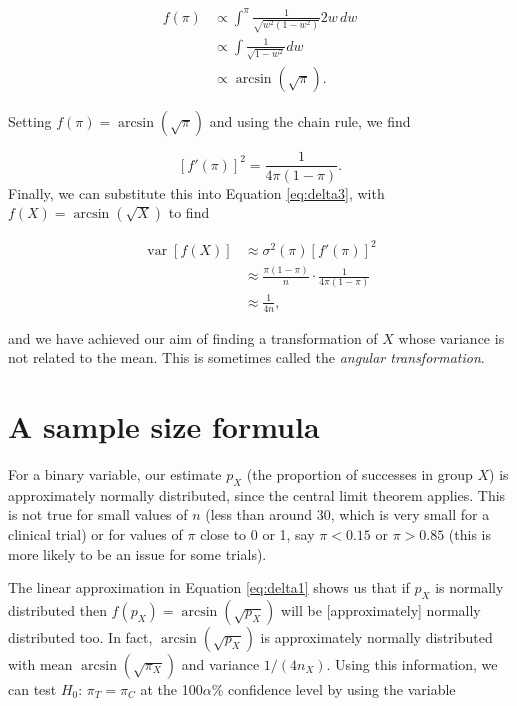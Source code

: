 \documentclass[
  openany]{book}
\theoremstyle{definition}
\theoremstyle{definition}
\theoremstyle{definition}
\theoremstyle{definition}
\theoremstyle{remark}
\begin{document}
\begin{align*}
f\left(\pi\right) & \propto \int^\pi{\frac{1}{\sqrt{w^2\left(1-w^2\right)}}2w\,dw}\\
&\propto \int{\frac{1}{\sqrt{1 - w^2}}}dw\\
& \propto \arcsin{\left(\sqrt{\pi}\right)}.
\end{align*}

Setting \(f\left(\pi\right) = \arcsin\left(\sqrt{\pi}\right)\) and using the chain rule, we find

\[\left[f'\left(\pi\right)\right]^2 = \frac{1}{4\pi\left(1-\pi\right)} .\]
Finally, we can substitute this into Equation \eqref{eq:delta3}, with \(f\left(X\right) = \arcsin\left(\sqrt{X}\right)\) to find

\begin{align*}
  \operatorname{var}\left[f\left(X\right)\right] & \approx \sigma^2\left(\pi\right)\left[f'\left(\pi\right)\right]^2  \\
& \approx{\frac{\pi\left(1-\pi\right)}{n}\cdot\frac{1}{4\pi\left(1-\pi\right)}}\\
& \approx{\frac{1}{4n}},
\end{align*}

and we have achieved our aim of finding a transformation of \(X\) whose variance is not related to the mean. This is sometimes called the \emph{angular transformation}.

\hypertarget{a-sample-size-formula}{%
\section{A sample size formula}\label{a-sample-size-formula}}

For a binary variable, our estimate \(p_X\) (the proportion of successes in group \(X\)) is approximately normally distributed, since the central limit theorem applies. This is not true for small values of \(n\) (less than around 30, which is very small for a clinical trial) or for values of \(\pi\) close to 0 or 1, say \(\pi<0.15\) or \(\pi>0.85\) (this is more likely to be an issue for some trials).

The linear approximation in Equation \eqref{eq:delta1} shows us that if \(p_X\) is normally distributed then \(f\left(p_X\right) = \arcsin\left(\sqrt{p_X}\right)\) will be {[}approximately{]} normally distributed too. In fact, \(\arcsin\left(\sqrt{p_X}\right)\) is approximately normally distributed with mean \(\arcsin{\left(\sqrt{\pi_X}\right)}\) and variance \(1/\left(4n_X\right)\). Using this information, we can test \(H_0:\,\pi_T =\pi_C\) at the 100\(\alpha\)\% confidence level by using the variable
\end{document}
